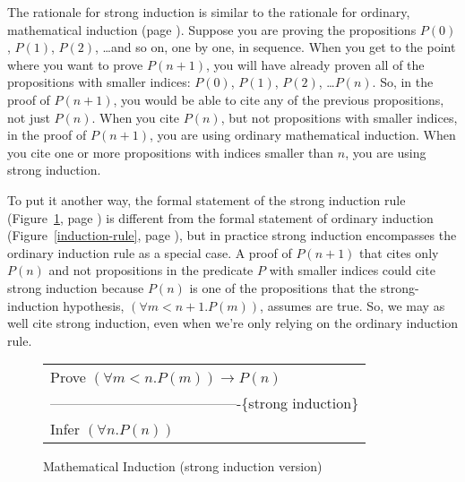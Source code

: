 \label{strong-induction-rationale}
The rationale for
strong induction is similar to
the rationale for ordinary, mathematical induction (page \pageref{induction-rationale}).
Suppose you are proving the propositions
$P(0)$, $P(1)$, $P(2)$, \dots and so on,
one by one, in sequence.
When you get to the point where you want to prove $P(n+1)$,
you will have already proven all of the propositions
with smaller indices:
$P(0)$, $P(1)$, $P(2)$, \dots $P(n)$.
So, in the proof of $P(n+1)$, you would be able to
cite any of the previous propositions, not just $P(n)$.
When you cite $P(n)$, but not propositions with smaller indices,
in the proof of $P(n+1)$, you are using ordinary mathematical induction.
When you cite one or more propositions with indices smaller than $n$,
you are using strong induction.

To put it another way, the formal statement of the strong induction rule
(Figure~\ref{strong-induction-rule}, page \pageref{strong-induction-rule})
is different from the formal statement of ordinary induction
(Figure~\ref{induction-rule}, page \pageref{induction-rule}), but
in practice strong induction encompasses the ordinary induction rule
as a special case. A proof of $P(n+1)$ that cites only $P(n)$
and not propositions in the predicate $P$ with smaller indices
could cite strong induction because $P(n)$ is one of the propositions
that the strong-induction
hypothesis, $(\forall m<n+1.P(m))$, assumes are true.
So, we may as well cite strong induction, even when we're only relying
on the ordinary induction rule.

\begin{figure}
\begin{center}
\begin{tabular}{l}
Prove $(\forall m<n.P(m))\rightarrow P(n)$ \\
----------------------------------------\{strong induction\}\\
Infer $(\forall n.P(n))$
\end{tabular}
\end{center}
\caption{Mathematical Induction (strong induction version)}
\label{strong-induction-rule}
\end{figure}

